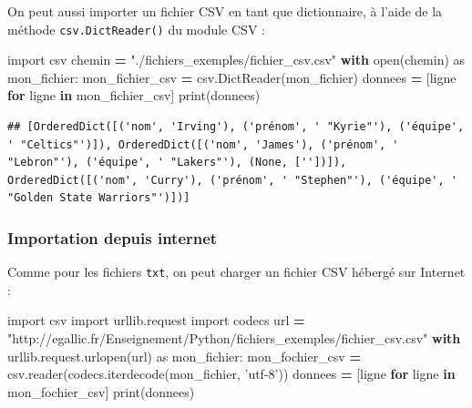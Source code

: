 \documentclass[12pt,]{book}
\newenvironment{Shaded}{\begin{snugshade}}{\end{snugshade}}
\newcommand{\KeywordTok}[1]{\textcolor[rgb]{0.13,0.29,0.53}{\textbf{#1}}}
\newcommand{\StringTok}[1]{\textcolor[rgb]{0.31,0.60,0.02}{#1}}
\newcommand{\ImportTok}[1]{#1}
\newcommand{\ControlFlowTok}[1]{\textcolor[rgb]{0.13,0.29,0.53}{\textbf{#1}}}
\newcommand{\OperatorTok}[1]{\textcolor[rgb]{0.81,0.36,0.00}{\textbf{#1}}}
\newcommand{\BuiltInTok}[1]{#1}
\newcommand{\NormalTok}[1]{#1}
\numberwithin{equation}{section}
\numberwithin{countremarque}{section}
\begin{document}
On peut aussi importer un fichier CSV en tant que dictionnaire, à l'aide
de la méthode \texttt{csv.DictReader()} du module CSV :

\begin{Shaded}
\begin{Highlighting}[]
\ImportTok{import}\NormalTok{ csv}
\NormalTok{chemin }\OperatorTok{=} \StringTok{"./fichiers_exemples/fichier_csv.csv"}
\ControlFlowTok{with} \BuiltInTok{open}\NormalTok{(chemin) }\ImportTok{as}\NormalTok{ mon_fichier:}
\NormalTok{    mon_fichier_csv }\OperatorTok{=}\NormalTok{ csv.DictReader(mon_fichier)}
\NormalTok{    donnees }\OperatorTok{=}\NormalTok{ [ligne }\ControlFlowTok{for}\NormalTok{ ligne }\KeywordTok{in}\NormalTok{ mon_fichier_csv]}
\BuiltInTok{print}\NormalTok{(donnees)}
\end{Highlighting}
\end{Shaded}

\begin{lstlisting}
## [OrderedDict([('nom', 'Irving'), ('prénom', ' "Kyrie"'), ('équipe', ' "Celtics"')]), OrderedDict([('nom', 'James'), ('prénom', ' "Lebron"'), ('équipe', ' "Lakers"'), (None, [''])]), OrderedDict([('nom', 'Curry'), ('prénom', ' "Stephen"'), ('équipe', ' "Golden State Warriors"')])]
\end{lstlisting}

\subsubsection{Importation depuis
internet}\label{importation-depuis-internet-1}

Comme pour les fichiers \texttt{txt}, on peut charger un fichier CSV
hébergé sur Internet :

\begin{Shaded}
\begin{Highlighting}[]
\ImportTok{import}\NormalTok{ csv}
\ImportTok{import}\NormalTok{ urllib.request}
\ImportTok{import}\NormalTok{ codecs}
\NormalTok{url }\OperatorTok{=} \StringTok{"http://egallic.fr/Enseignement/Python/fichiers_exemples/fichier_csv.csv"}
\ControlFlowTok{with}\NormalTok{ urllib.request.urlopen(url) }\ImportTok{as}\NormalTok{ mon_fichier:}
\NormalTok{    mon_fochier_csv }\OperatorTok{=}\NormalTok{ csv.reader(codecs.iterdecode(mon_fichier, }\StringTok{'utf-8'}\NormalTok{))}
\NormalTok{    donnees }\OperatorTok{=}\NormalTok{ [ligne }\ControlFlowTok{for}\NormalTok{ ligne }\KeywordTok{in}\NormalTok{ mon_fochier_csv]}
\BuiltInTok{print}\NormalTok{(donnees)}
\end{Highlighting}
\end{Shaded}
\end{document}
